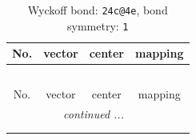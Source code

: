 \documentclass[fleqn,8pt]{jsarticle}
\begin{document}
\renewcommand{\arraystretch}{1.2}
\begin{longtable}{cccc}
\caption{Wyckoff bond: {\tt 24c@4e}, bond symmetry: {\tt 1}}
 \\
 \hline \hline
No. & vector & center & mapping \\ \hline \endfirsthead

\multicolumn{3}{l}{\tablename\ \thetable{}} \\
 \hline \hline
No. & vector & center & mapping \\ \hline \endhead

 \hline \hline
\multicolumn{3}{r}{\footnotesize\it continued ...} \\ \endfoot

 \hline \hline
\multicolumn{3}{r}{} \\ \endlastfoot


\end{longtable}
\end{document}
